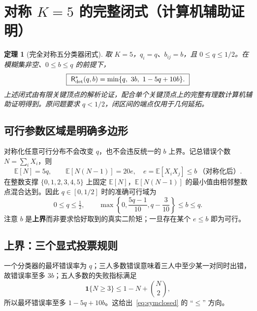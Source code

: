 \documentclass[11pt,a4paper]{ctexart}
\newtheorem{theorem}{定理}[section]
\theoremstyle{definition}
\newcommand{\Risk}{\mathsf R}
\newcommand{\I}{\mathbf 1}
\newcommand{\E}{\mathbb E}
\begin{document}
\section{对称 $K=5$ 的完整闭式（计算机辅助证明）}
\begin{theorem}[完全对称五分类器闭式]\label{thm:K5sym}
取 $K=5$，$q_i=q$、$b_{ij}=b$，且 $0\le q\le1/2$。在模糊集非空、$0\le b\le q$ 的前提下，
\begin{equation}\label{eq:symclosed}
\boxed{\ \Risk_{\rm det}^*(q,b)=\min\{q,\ 3b,\ 1-5q+10b\}.\ }
\end{equation}
上述闭式由有限关键顶点的解析论证，配合单个关键顶点上的完整有理数计算机辅助证明得到。原问题要求 $q<1/2$，闭区间的端点仅用于几何延拓。
\end{theorem}

\subsection{可行参数区域是明确多边形}
对称化任意可行分布不会改变 $q$，也不会违反统一的 $b$ 上界。记总错误个数 $N=\sum_iX_i$，则
\[
\E[N]=5q,\qquad \E[N(N-1)]=20e,\quad e=\E[X_iX_j]\le b\ \text{（对称化后）}.
\]
在整数支撑 $\{0,1,2,3,4,5\}$ 上固定 $\E[N]$，$\E[N(N-1)]$ 的最小值由相邻整数点混合达到。因此 $q\in[0,1/2]$ 时的准确可行域为
\begin{equation}\label{eq:feasiblesym}
\boxed{\ 0\le q\le\tfrac12,\qquad
\max\left\{0,\frac{5q-1}{10},q-\frac3{10}\right\}\le b\le q.\ }
\end{equation}
注意 $b$ 是\textbf{上界}而非要求恰好取到的真实二阶矩；一旦存在某个 $e\le b$ 即为可行。

\subsection{上界：三个显式投票规则}
一个分类器的最坏错误率为 $q$；三人多数错误意味着三人中至少某一对同时出错，故错误率至多 $3b$；五人多数的失败指标满足
\[
\I\{N\ge3\}\le1-N+\binom N2,
\]
所以最坏错误率至多 $1-5q+10b$。这给出~\eqref{eq:symclosed} 的 ``$\le$'' 方向。
\end{document}
